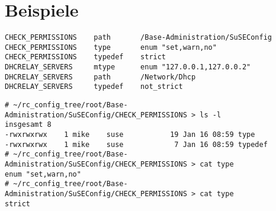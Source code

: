 \documentclass[pdftex,titlepage,10pt]{article}
\begin{document}
\section{Beispiele}
{\footnotesize \begin{verbatim}
CHECK_PERMISSIONS    path       /Base-Administration/SuSEConfig
CHECK_PERMISSIONS    type       enum "set,warn,no"
CHECK_PERMISSIONS    typedef    strict
DHCRELAY_SERVERS     mtype      enum "127.0.0.1,127.0.0.2"
DHCRELAY_SERVERS     path       /Network/Dhcp
DHCRELAY_SERVERS     typedef    not_strict
\end{verbatim}}

{\footnotesize \begin{verbatim}
# ~/rc_config_tree/root/Base-Administration/SuSEConfig/CHECK_PERMISSIONS > ls -l
insgesamt 8
-rwxrwxrwx    1 mike    suse           19 Jan 16 08:59 type
-rwxrwxrwx    1 mike    suse            7 Jan 16 08:59 typedef
# ~/rc_config_tree/root/Base-Administration/SuSEConfig/CHECK_PERMISSIONS > cat type
enum "set,warn,no"
# ~/rc_config_tree/root/Base-Administration/SuSEConfig/CHECK_PERMISSIONS > cat type
strict
\end{verbatim}}
\end{document}
